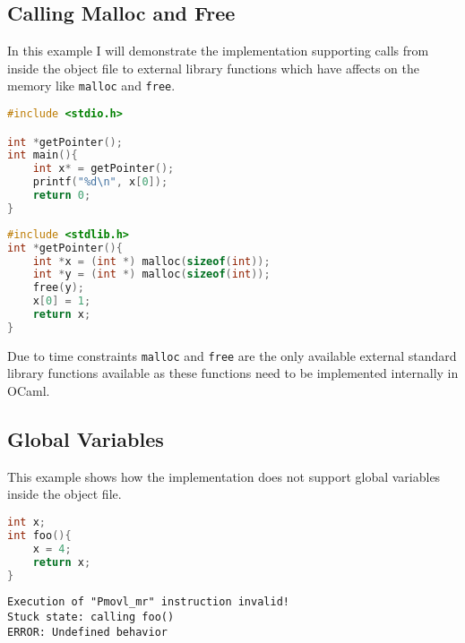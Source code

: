 \subsection{Calling Malloc and Free}

In this example I will demonstrate the implementation supporting calls from inside the object file to external library functions which have affects on the memory like \lstinline{malloc} and \lstinline{free}.

\begin{multicols}{2}
\begin{lstlisting}[language=C, caption=call\_malloc.c]
#include <stdio.h>

int *getPointer();
int main(){
    int x* = getPointer();
    printf("%d\n", x[0]);
    return 0;
}
\end{lstlisting}

\begin{lstlisting}[language=C, caption=allocate\_memory.c]
#include <stdlib.h>
int *getPointer(){
    int *x = (int *) malloc(sizeof(int));
    int *y = (int *) malloc(sizeof(int));
    free(y);
    x[0] = 1;
    return x;
}
\end{lstlisting}
\end{multicols}

Due to time constraints \lstinline{malloc} and \lstinline{free} are the only available external standard library functions available as these functions need to be implemented internally in OCaml.

\subsection{Global Variables}
This example shows how the implementation does not support global variables inside the object file. 

\begin{multicols}{2}

\begin{lstlisting}[language=C, caption=global.c]
int x;
int foo(){
    x = 4;
    return x;
}
\end{lstlisting}

\begin{lstlisting}[frame=lbrt, numbers=none, caption=\texttt{\$ ccomp -interp call\_global.c -link global.o}]
Execution of "Pmovl_mr" instruction invalid!
Stuck state: calling foo()
ERROR: Undefined behavior
\end{lstlisting}

\end{multicols}


